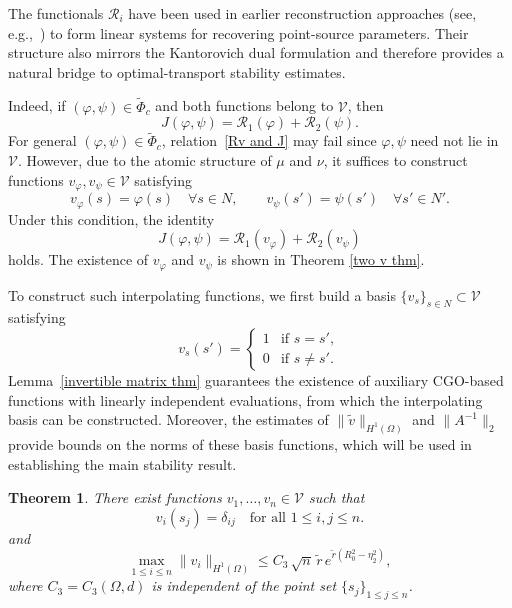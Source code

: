 \documentclass[12pt]{amsart}
\newtheorem{thm}{Theorem}
\begin{document}
The functionals $\mathcal{R}_i$ have been used in earlier reconstruction approaches (see, e.g.,~\cite{ElBadiaHa-Duong2000, qiu_traceability_2025}) to form linear systems for recovering point-source parameters. Their structure also mirrors the Kantorovich dual formulation and therefore provides a natural bridge to optimal-transport stability estimates.

Indeed, if $(\varphi,\psi)\in\widetilde{\Phi}_c$ and both functions belong to $\mathcal{V}$, then
\begin{equation}\label{Rv and J}
J(\varphi,\psi)=\mathcal{R}_1(\varphi)+\mathcal{R}_2(\psi).
\end{equation}
For general $(\varphi,\psi)\in\widetilde{\Phi}_c$, relation~\eqref{Rv and J} may fail since $\varphi,\psi$ need not lie in $\mathcal{V}$. However, due to the atomic structure of $\mu$ and $\nu$, it suffices to construct functions $v_\varphi,v_\psi\in\mathcal{V}$ satisfying
\begin{equation} \label{vvarphi and vpsi}
v_\varphi(s) = \varphi(s) \quad \forall s \in N, \qquad 
v_\psi(s') = \psi(s') \quad \forall s' \in N'.
\end{equation}
Under this condition, the identity
\[
J(\varphi, \psi) = \mathcal{R}_1(v_\varphi) + \mathcal{R}_2(v_\psi)
\]
holds. The existence of \(v_\varphi\) and \(v_\psi\) is shown in Theorem \ref{two v thm}.

To construct such interpolating functions, we first build a basis $\{v_s\}_{s\in N}\subset\mathcal{V}$ satisfying
\[
v_s(s')=
\begin{cases}
1 & \text{if } s=s',\\
0 & \text{if } s\ne s'.
\end{cases}
\]
Lemma~\ref{invertible matrix thm} guarantees the existence of auxiliary CGO-based functions with linearly independent evaluations, from which the interpolating basis can be constructed. Moreover, the estimates of $\|\tilde{v}\|_{H^1(\Omega)}$ and $\|A^{-1}\|_2$ provide bounds on the norms of these basis functions, which will be used in establishing the main stability result.

\begin{thm}\label{basis thm}
There exist functions $v_1,\dots,v_n\in\mathcal{V}$ such that
\begin{equation}\label{delta condition}
v_i(s_j) = \delta_{ij} \quad \text{for all } 1 \leq i, j \leq n.
\end{equation}
and
\begin{equation}\label{Bound of v}
\max_{1\le i\le n}\|v_i\|_{H^1(\Omega)}
\le C_3\,\sqrt{n}\,\tilde r\,e^{\tilde r(R_0^2-\eta_2^2)},
\end{equation}
where $C_3=C_3(\Omega,d)$ is independent of the point set \( \{s_j\}_{1 \leq j \leq n} \).
\end{thm}
\end{document}
